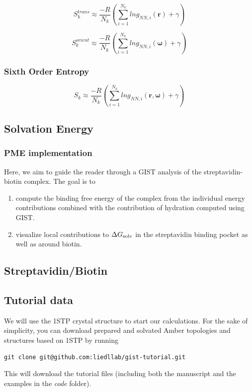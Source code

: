 \documentclass[9pt,tutorial]{livecoms}
\newcommand{\dgsolv}{\Delta G_\textup{solv}}
\newcommand{\software}{\emph}
\begin{document}
\begin{equation}
        S_{k}^\textit{trans} \approx \frac{-R}{N_\textit{k}} \left( \sum _{i=1}^{N_k} ln g_{NN, \textit{i}} \left( \textbf{r} \right) + \gamma \right)
\end{equation}

\begin{equation}
        S_{k}^\textit{orient} \approx \frac{-R}{N_\textit{k}} \left( \sum _{i=1}^{N_k} ln g_{NN, \textit{i}} \left( \mathbf {\omega} \right) + \gamma \right)
\end{equation}

\subsubsection{Sixth Order Entropy}
\begin{equation}
    S_\textit{k} \approx \frac{-R}{N_\textit{k}} \left( \sum _{i=1}^{N_k} ln g_{NN, \textit{i}} \left( \textbf{r}, \mathbf {\omega} \right) + \gamma \right)
\end{equation}


\subsection{Solvation Energy}
\subsubsection{PME implementation}

Here, we aim to guide the reader through a GIST analysis of the streptavidin-biotin complex. The goal is to
\begin{enumerate}
	\item compute the binding free energy of the complex from the individual energy contributions combined with the contribution of hydration computed using GIST.
	\item visualize local contributions to $\dgsolv$ in the streptavidin binding pocket as well as around biotin.
\end{enumerate}

\subsection{Streptavidin/Biotin}
\subsection{Tutorial data}
We will use the 1STP crystal structure to start our calculations.
For the sake of simplicity, you can download prepared and solvated Amber topologies and structures based on 1STP by running
\begin{lstlisting}
git clone git@github.com:liedllab/gist-tutorial.git
\end{lstlisting}
This will download the tutorial files (including both the manuscript and the examples in the \software{code} folder).
\end{document}
